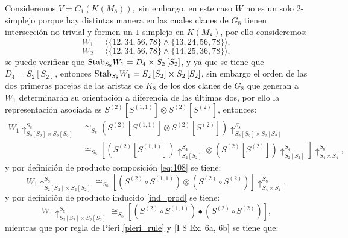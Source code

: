 \documentclass[12pt]{book}
\theoremstyle{definition}
\newcounter{in}
\newcounter{ini}
\begin{document}
Consideremos $V = C_{1}(K(M_{8})),$ sin embargo, en este caso $W$ no es un solo $2$-simplejo porque hay distintas manera en las cuales clanes de $G_{8}$ tienen intersección no trivial y formen un $1$-simplejo en $K(M_{8})$, por ello consideremos:
$$W_{1} = \langle \{12,34,56,78\} \wedge \{13,24,56,78\} \rangle,$$
$$W_{2} = \langle \{12,34,56,78\} \wedge \{14,25,36,78\} \rangle,$$
se puede verificar que $\textup{Stab}_{S_{8}} W_{1} = D_{4} \times S_{2} \left [ S_{2} \right ]$, y ya que se tiene que $D_{4} = S_{2}\left [ S_{2} \right ]$, entonces $\textup{Stab}_{S_{8}} W_{1} = S_{2} \left [ S_{2} \right ] \times S_{2} \left [ S_{2} \right ]$, sin embargo el orden de las dos primeras parejas de las aristas de $K_{8}$ de los dos clanes de $G_{8}$ que generan a $W_{1}$ determinarán su orientación a diferencia de las últimas dos, por ello la representación asociada es $S^{(2)} \left [ S^{(1,1)} \right ] \otimes S^{(2)} \left [ S^{(2)} \right ]$, entonces:
\begin{equation}
\begin{aligned}
W_{1} \uparrow_{S_{2} \left [ S_{2} \right ] \times S_{2} \left [ S_{2} \right ]}^{S_{8}} & \cong_{S_{8}} (S^{(2)} \left [ S^{(1,1)} \right ] \otimes S^{(2)} \left [ S^{(2)} \right ]) \uparrow_{S_{2} \left [ S_{2} \right ] \times S_{2} \left [ S_{2} \right ]}^{S_{8}} \\
& \cong_{S_{8}} \left [ (S^{(2)} \left [ S^{(1,1)} \right ])\uparrow_{S_{2} \left [ S_{2} \right ]}^{S_{4}} \otimes (S^{(2)} \left [ S^{(2)} \right ])\uparrow_{S_{2} \left [ S_{2} \right ]}^{S_{4}} \right ] \uparrow_{S_{4} \times S_{4}}^{S_{8}},
\end{aligned}
\end{equation}
y por definición de producto composición \ref{eq:108} se tiene:
\begin{equation}
W_{1} \uparrow_{S_{2} \left [ S_{2} \right ] \times S_{2} \left [ S_{2} \right ]}^{S_{8}} \cong_{S_{8}} \left [ (S^{(2)} \circ S^{(1,1)}) \otimes (S^{(2)} \circ S^{(2)})  \right ] \uparrow_{S_{4} \times S_{4}}^{S_{8}},
\end{equation}
y por definición de producto inducido  \ref{ind_prod} se tiene:
\begin{equation}
W_{1} \uparrow_{S_{2} \left [ S_{2} \right ] \times S_{2} \left [ S_{2} \right ]}^{S_{8}} \cong_{S_{8}} \left [ (S^{(2)} \circ S^{(1,1)}) \bullet (S^{(2)} \circ S^{(2)})  \right ],
\end{equation}
mientras que por regla de Pieri \ref{pieri_rule} y \cite{macdonald1998symmetric} [I 8 Ex. 6a, 6b] se tiene que:
\end{document}
